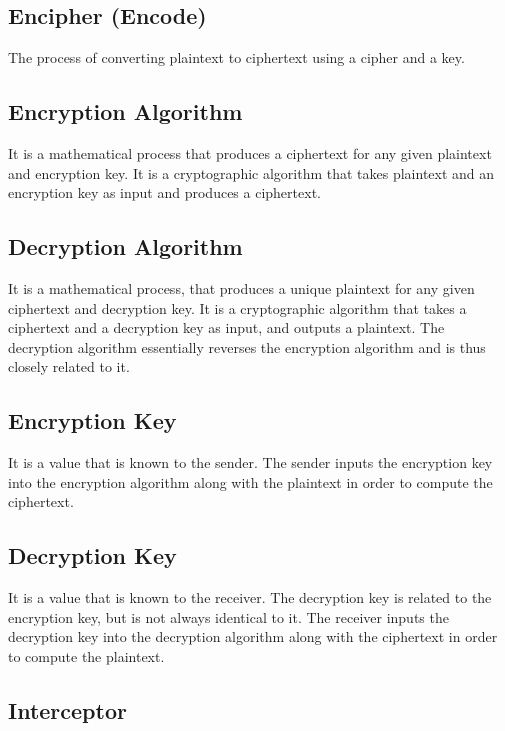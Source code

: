 \documentclass[british]{article}
\begin{document}
\subsection{Encipher (Encode)}

The process of converting plaintext to ciphertext using a cipher and
a key.

\subsection{Encryption Algorithm}

It is a mathematical process that produces a ciphertext for any given
plaintext and encryption key. It is a cryptographic algorithm that
takes plaintext and an encryption key as input and produces a ciphertext.

\subsection{Decryption Algorithm}

It is a mathematical process, that produces a unique plaintext for
any given ciphertext and decryption key. It is a cryptographic algorithm
that takes a ciphertext and a decryption key as input, and outputs
a plaintext. The decryption algorithm essentially reverses the encryption
algorithm and is thus closely related to it.

\subsection{Encryption Key}

It is a value that is known to the sender. The sender inputs the encryption
key into the encryption algorithm along with the plaintext in order
to compute the ciphertext.

\subsection{Decryption Key}

It is a value that is known to the receiver. The decryption key is
related to the encryption key, but is not always identical to it.
The receiver inputs the decryption key into the decryption algorithm
along with the ciphertext in order to compute the plaintext.

\subsection{Interceptor}
\end{document}

